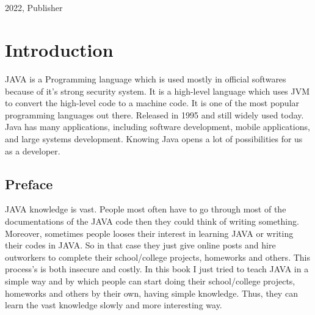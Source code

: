 \documentclass[openany]{book}  %
\begin{document}
\begin{titlepage}
\begin{center}
{\begin{verbatim}
                                                                                                                                                                                                                                                                     
                                                                                                                                                                                                                                                                            
                                                                                                      
                                                                                                      
        \end{verbatim}
        }
    \end{center}
    \vfill
    \vspace*{\fill}
    {\small{2022, Publisher}}
\end{titlepage}

\vspace*{\fill}

\pagecolor{smokeWhite}
\color{black}
\newpage
\tableofcontents
\newpage
\listoffigures
\newpage
\listoftables
\newpage
\setlength{\evensidemargin}{1.44614pt}           %
% 
% 
\part{Introduction}
\vspace*{\fill}
JAVA\cite{Ref1} is a Programming language which is used mostly in official softwares because of it's strong security system.
It is a high-level language which uses JVM to convert the high-level code to a machine code.
It is one of the most popular programming languages out there. Released in 1995 and still widely used today.
Java has many applications, including software development, mobile applications, and large systems development.
Knowing Java opens a lot of possibilities for us as a developer.
\vspace*{\fill}

\chapter*{Preface}
JAVA\cite{Ref1} knowledge is vast. People most often have to go through most of the documentations of the JAVA code then they could think of writing something.
Moreover, sometimes people looses their interest in learning JAVA or writing their codes in JAVA. So in that case they just give online posts
and hire outworkers to complete their school/college projects, homeworks and others.
This process's is both insecure and costly. In this book I just tried to teach JAVA in a simple way and by which
people can start doing their school/college projects, homeworks and others by their own, having simple knowledge. Thus, they can learn the vast knowledge slowly and more interesting way.
\end{document}

